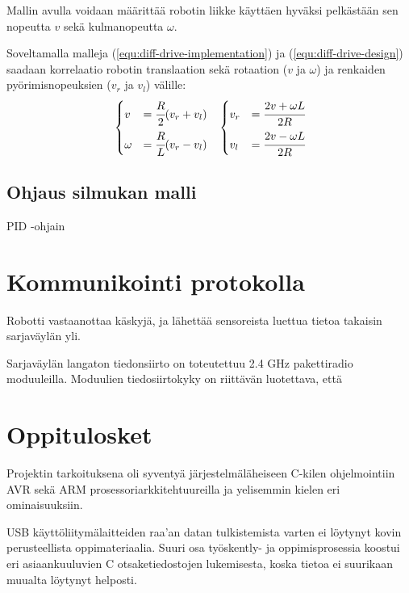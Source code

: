 \documentclass[]{article} %
\numberwithin{equation}{section}
\numberwithin{figure}{section}
\numberwithin{table}{section}
\begin{document}
Mallin avulla voidaan määrittää robotin liikke käyttäen hyväksi pelkästään sen nopeutta $v$ sekä kulmanopeutta $\omega$.

Soveltamalla malleja (\ref{equ:diff-drive-implementation}) ja (\ref{equ:diff-drive-design}) saadaan korrelaatio robotin translaation sekä rotaation ($v$ ja $\omega$) ja renkaiden pyörimisnopeuksien ($v_r$ ja $v_l$) välille:
\begin{align}
    \label{equ:diff-drive-correlation}
    &
    \begin{dcases}
        v &= \cfrac{R}{2} (v_r + v_l)\\
        \omega &= \cfrac{R}{L} (v_r - v_l)\\
    \end{dcases}
    &
    \begin{dcases}
        v_r &= \cfrac{2v + \omega L}{2R}\\
        v_l &= \cfrac{2v - \omega L}{2R}\\
    \end{dcases}
\end{align}



\subsection{Ohjaus silmukan malli}
\label{sub:Ohjaus silmukan malli}

PID -ohjain


\section{Kommunikointi protokolla}
\label{sec:Kommunikointi protokilla}

Robotti vastaanottaa käskyjä, ja lähettää sensoreista luettua tietoa takaisin sarjaväylän yli.

Sarjaväylän langaton tiedonsiirto on toteutettuu 2.4 GHz pakettiradio moduuleilla.
Moduulien tiedosiirtokyky on riittävän luotettava, että 


\section{Oppitulosket}
\label{sec:Oppitulosket}

Projektin tarkoituksena oli syventyä järjestelmäläheiseen C-kilen ohjelmointiin AVR sekä ARM prosessoriarkkitehtuureilla ja yelisemmin kielen eri ominaisuuksiin.

USB käyttöliitymälaitteiden raa'an datan tulkistemista varten ei löytynyt kovin perusteellista oppimateriaalia.
Suuri osa työskently- ja oppimisprosessia koostui eri asiaankuuluvien C otsaketiedostojen lukemisesta, koska tietoa ei suurikaan muualta löytynyt helposti. 
\end{document}
